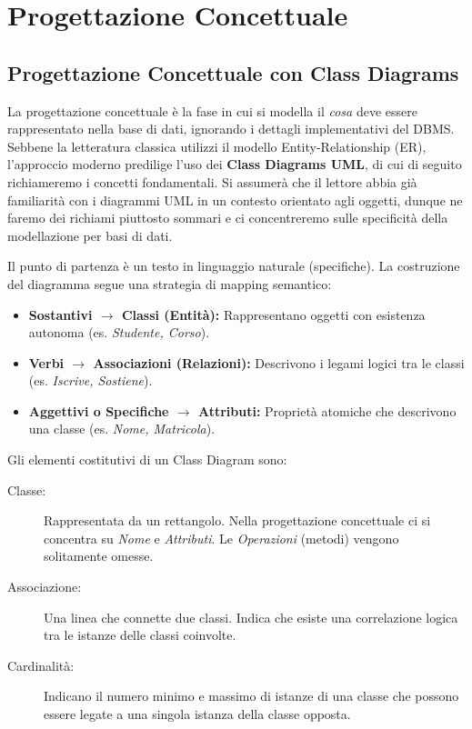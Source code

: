 \chapter{Progettazione Concettuale}

\section{Progettazione Concettuale con Class Diagrams}

La progettazione concettuale è la fase in cui si modella il \textit{cosa} deve essere rappresentato nella base di dati, ignorando i dettagli implementativi del DBMS. Sebbene la letteratura classica utilizzi il modello Entity-Relationship (ER), l'approccio moderno predilige l'uso dei \textbf{Class Diagrams UML}, di cui di seguito richiameremo i concetti fondamentali. Si assumerà che il lettore abbia già familiarità con i diagrammi UML in un contesto orientato agli oggetti, dunque ne faremo dei richiami piuttosto sommari e ci concentreremo sulle specificità della modellazione per basi di dati.
\vspace{\baselineskip}

Il punto di partenza è un testo in linguaggio naturale (specifiche). La costruzione del diagramma segue una strategia di mapping semantico:

\begin{itemize}
    \item \textbf{Sostantivi $\rightarrow$ Classi (Entità):} Rappresentano oggetti con esistenza autonoma (es. \textit{Studente, Corso}).
    \item \textbf{Verbi $\rightarrow$ Associazioni (Relazioni):} Descrivono i legami logici tra le classi (es. \textit{Iscrive, Sostiene}).
    \item \textbf{Aggettivi o Specifiche $\rightarrow$ Attributi:} Proprietà atomiche che descrivono una classe (es. \textit{Nome, Matricola}).
\end{itemize}
\vspace{\baselineskip}

Gli elementi costitutivi di un Class Diagram sono:
\begin{description}
    \item[Classe:] Rappresentata da un rettangolo. Nella progettazione concettuale ci si concentra su \textit{Nome} e \textit{Attributi}. Le \textit{Operazioni} (metodi) vengono solitamente omesse.
    \item[Associazione:] Una linea che connette due classi. Indica che esiste una correlazione logica tra le istanze delle classi coinvolte.
    \item[Cardinalità:] Indicano il numero minimo e massimo di istanze di una classe che possono essere legate a una singola istanza della classe opposta.
\end{description}

